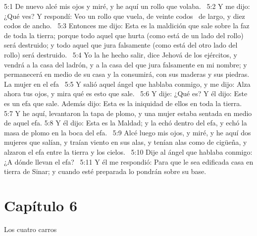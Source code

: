 5:1 De nuevo alcé mis ojos y miré, y he aquí un rollo que volaba.  
5:2 Y me dijo: ¿Qué ves? Y respondí: Veo un rollo que vuela, de veinte codos  de largo, y diez codos de ancho.  
5:3 Entonces me dijo: Esta es la maldición que sale sobre la faz de toda la tierra; porque todo aquel que hurta (como está de un lado del rollo) será destruido; y todo aquel que jura falsamente (como está del otro lado del rollo) será destruido.  
5:4 Yo la he hecho salir, dice Jehová de los ejércitos, y vendrá a la casa del ladrón, y a la casa del que jura falsamente en mi nombre; y permanecerá en medio de su casa y la consumirá, con sus maderas y sus piedras.  
La mujer en el efa  
5:5 Y salió aquel ángel que hablaba conmigo, y me dijo: Alza ahora tus ojos, y mira qué es esto que sale.  
5:6 Y dije: ¿Qué es? Y él dijo: Este es un efa que sale. Además dijo: Esta es la iniquidad de ellos en toda la tierra.  
5:7 Y he aquí, levantaron la tapa de plomo, y una mujer estaba sentada en medio de aquel efa. 
5:8 Y él dijo: Esta es la Maldad; y la echó dentro del efa, y echó la masa de plomo en la boca del efa.  
5:9 Alcé luego mis ojos, y miré, y he aquí dos mujeres que salían, y traían viento en sus alas, y tenían alas como de cigüeña, y alzaron el efa entre la tierra y los cielos.  
5:10 Dije al ángel que hablaba conmigo: ¿A dónde llevan el efa?  
5:11 Y él me respondió: Para que le sea edificada casa en tierra de Sinar; y cuando esté preparada lo pondrán sobre su base.  
\section*{Capítulo 6 }
Los cuatro carros  

